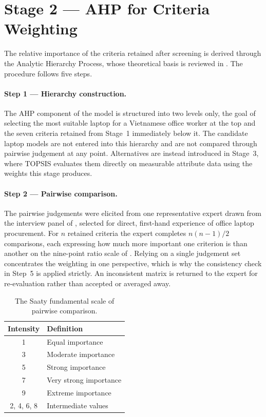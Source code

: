 \section{Stage 2 --- AHP for Criteria Weighting}\label{sec:stage2}

The relative importance of the criteria retained after screening is derived through the
Analytic Hierarchy Process, whose theoretical basis is reviewed in .
The procedure follows five steps.

\paragraph{Step 1 --- Hierarchy construction.}
The AHP component of the model is structured into two levels only, the goal of selecting
the most suitable laptop for a Vietnamese office worker at the top and the seven criteria
retained from Stage~1 immediately below it. The candidate laptop models are not entered
into this hierarchy and are not compared through pairwise judgement at any point.
Alternatives are instead introduced in Stage~3, where TOPSIS evaluates them directly on
measurable attribute data using the weights this stage produces.

\paragraph{Step 2 --- Pairwise comparison.}
The pairwise judgements were elicited from one representative expert drawn from the
interview panel of , selected for direct, first-hand
experience of office laptop procurement. For $n$ retained criteria the expert completes
$n(n-1)/2$ comparisons, each expressing how much more important one criterion is than
another on the nine-point ratio scale of . Relying on a single judgement
set concentrates the weighting in one perspective, which is why the consistency check in
Step~5 is applied strictly. An inconsistent matrix is returned to the expert for
re-evaluation rather than accepted or averaged away.

\begin{table}[htbp]
  \centering
  \caption{The Saaty fundamental scale of pairwise comparison.}
  \label{tab:saaty}
  \begin{tabular}{@{}cl@{}}
    \toprule
    \textbf{Intensity} & \textbf{Definition} \\
    \midrule
    1 & Equal importance \\
    3 & Moderate importance \\
    5 & Strong importance \\
    7 & Very strong importance \\
    9 & Extreme importance \\
    2, 4, 6, 8 & Intermediate values \\
    \bottomrule
  \end{tabular}
\end{table}

